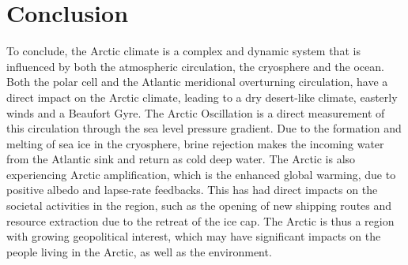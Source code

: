\section{Conclusion}
To conclude, the Arctic climate is a complex and dynamic system that is influenced by both the atmospheric circulation, the cryosphere and the ocean. Both the polar cell and the Atlantic meridional overturning circulation, have a direct impact on the Arctic climate, leading to a dry desert-like climate, easterly winds and a Beaufort Gyre. The Arctic Oscillation is a direct measurement of this circulation through the sea level pressure gradient. Due to the formation and melting of sea ice in the cryosphere, brine rejection makes the incoming water from the Atlantic sink and return as cold deep water. The Arctic is also experiencing Arctic amplification, which is the enhanced global warming, due to positive albedo and lapse-rate feedbacks. This has had direct impacts on the societal activities in the region, such as the opening of new shipping routes and resource extraction due to the retreat of the ice cap. The Arctic is thus a region with growing geopolitical interest, which may have significant impacts on the people living in the Arctic, as well as the environment.